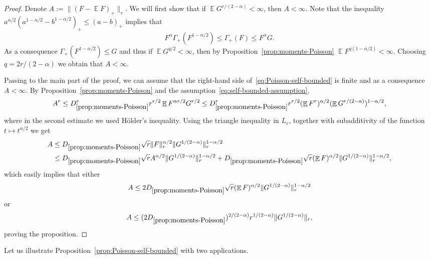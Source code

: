\documentclass[a4paper]{amsart}
\theoremstyle{definition}
\theoremstyle{remark}
\numberwithin{equation}{section}
\newcommand{\fs}{D_{\ref{prop:moments-Poisson}}}
\DeclareMathOperator{\EE}{\mathbb{E}} %
\begin{document}
\begin{proof}
Denote $A:= \|(F-\EE F)_+\|_r$. We will first show that if $\EE G^{r/(2-\alpha)} < \infty$, then $A < \infty$.
Note that the inequality $a^{\alpha/2}(a^{1-\alpha/2} - b^{1-\alpha/2})_+ \le (a - b)_+$ implies that
\begin{displaymath}
  F^\alpha \Gamma_+(F^{1-\alpha/2}) \le \Gamma_+(F) \le F^{\alpha} G.
\end{displaymath}
As a consequence $\Gamma_+(F^{1-\alpha/2}) \le G$ and thus if $\EE G^{q/2} < \infty$, then by Proposition~\ref{prop:moments-Poisson} $\EE F^{q(1-\alpha/2)} < \infty$. Choosing $q = 2r/(2-\alpha)$ we obtain that $A < \infty$.

Passing to the main part of the proof, we can assume that the right-hand side of~\eqref{eq:Poisson-self-bounded} is finite and as a consequence $A < \infty$. 
By Proposition~\ref{prop:moments-Poisson} and the assumption~\eqref{eq:self-bounded-assumption},
\begin{displaymath}
  A^r \le \fs^r r^{r/2} \EE F^{\alpha r/2} G^{r/2} \le \fs^r r^{r/2} (\EE F^r)^{\alpha/2} (\EE G^{r/(2-\alpha)})^{1-\alpha/2},
\end{displaymath}
where in the second estimate we used H\"older's inequality. Using the triangle inequality in $L_r$, together with subadditivity of the function $t \mapsto t^{\alpha/2}$ we get
\begin{align*}
  A &\le \fs \sqrt{r} \|F\|_r^{\alpha/2}\|G^{1/(2-\alpha)}\|_r^{1-\alpha/2} \\
  &\le \fs\sqrt{r} A^{\alpha/2} \|G^{1/(2-\alpha)}\|_r^{1-\alpha/2} + \fs\sqrt{r}(\EE F)^{\alpha/2}\|G^{1/(2-\alpha)}\|_r^{1-\alpha/2},
\end{align*}
which easily implies that either
\begin{displaymath}
A \le 2\fs\sqrt{r}(\EE F)^{\alpha/2}\|G^{1/(2-\alpha)}\|_r^{1-\alpha/2}
\end{displaymath}
 or
\begin{displaymath}
A \le (2\fs)^{2/(2-\alpha)} r^{1/(2-\alpha)}\|G^{1/(2-\alpha)}\|_r,
\end{displaymath}
proving the proposition.
\end{proof}

Let us illustrate Proposition~\ref{prop:Poisson-self-bounded} with two applications.
\end{document}
